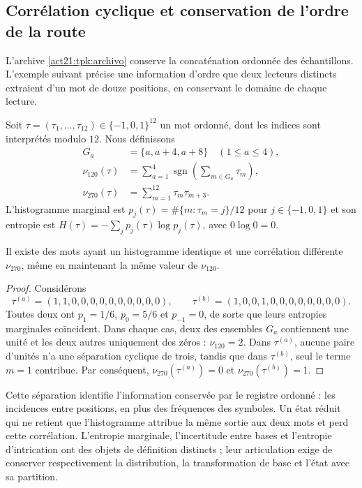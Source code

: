 \subsection{Corrélation cyclique et conservation de l'ordre de la route}
\label{sec:rec27-memoria}

L'archive \eqref{act21:tpk:archivo} conserve la concaténation ordonnée des échantillons. L'exemple suivant précise une information d'ordre que deux lecteurs distincts extraient d'un mot de douze positions, en conservant le domaine de chaque lecture.

Soit $\tau=(\tau_1,\ldots,\tau_{12})\in\{-1,0,1\}^{12}$ un mot
ordonné, dont les indices sont interprétés modulo $12$. Nous définissons
\[
\begin{aligned}
 G_a&=\{a,a+4,a+8\}\quad(1\leq a\leq4),\\
 \nu_{120}(\tau)&=\sum_{a=1}^4\operatorname{sgn}
 \left(\sum_{m\in G_a}\tau_m\right),\\
 \nu_{270}(\tau)&=\sum_{m=1}^{12}\tau_m\tau_{m+3}.
\end{aligned}
\]
L'histogramme marginal est $p_j(\tau)=\#\{m:\tau_m=j\}/12$ pour
$j\in\{-1,0,1\}$ et son entropie est
$H(\tau)=-\sum_j p_j(\tau)\log p_j(\tau)$, avec $0\log0=0$.

\begin{proposition}
Il existe des mots ayant un histogramme identique et une corrélation différente
$\nu_{270}$, même en maintenant la même valeur de $\nu_{120}$.
\end{proposition}
\begin{proof}
Considérons
\[
 \tau^{(a)}=(1,1,0,0,0,0,0,0,0,0,0,0),\qquad
 \tau^{(b)}=(1,0,0,1,0,0,0,0,0,0,0,0).
\]
Toutes deux ont $p_1=1/6$, $p_0=5/6$ et $p_{-1}=0$, de sorte que leurs
entropies marginales coïncident. Dans chaque cas, deux des ensembles $G_a$
contiennent une unité et les deux autres uniquement des zéros : $\nu_{120}=2$.
Dans $\tau^{(a)}$, aucune paire d'unités n'a une séparation cyclique de trois,
tandis que dans $\tau^{(b)}$, seul le terme $m=1$ contribue.
Par conséquent, $\nu_{270}(\tau^{(a)})=0$ et $\nu_{270}(\tau^{(b)})=1$.
\end{proof}

Cette séparation identifie l'information conservée par le registre ordonné : les incidences entre positions, en plus des fréquences des symboles. Un état réduit qui ne retient que l'histogramme attribue la même sortie aux deux mots et perd cette corrélation. L'entropie marginale, l'incertitude entre bases et l'entropie d'intrication ont des objets de définition distincts ; leur articulation exige de conserver respectivement la distribution, la transformation de base et l'état avec sa partition.
